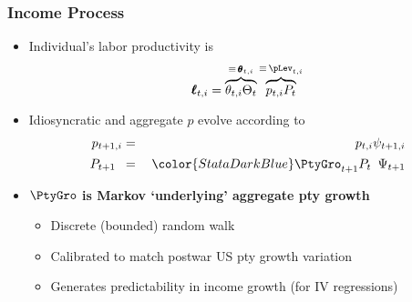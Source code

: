 \documentclass{beamer}\usepackage{dcolumn}
\newcommand{\jemph}[1]{{\color{StataDarkBlue}#1}}
\newcommand{\jbemph}[1]{\textbf{\color{SlideNavy}#1}}
\providecommand{\jemph}[1]{{\color{jirkasblue}#1}}
\begin{document}
\begin{frame}
\frametitle{Income Process}

\begin{itemize}
\item  Individual's labor productivity is
$$
\pmb{\ell}_{t,i} = \overbrace{\theta_{t,i}\Theta_{t}}^{\equiv\,\pmb{\theta}_{t,i}}\overbrace{{p}_{t,i} {P}_{t}}^{\equiv\, \pLev_{t,i}}
$$

\item  Idiosyncratic and aggregate $p$ evolve according to
\begin{eqnarray*}
{{p}}_{t+1,i} & =&  \phantom{\jemph{\PtyGro}_{t+1}}{{p}}_{t,i} \psi_{t+1,i}  \\
 {P}_{t+1\phantom{,i}} & =&  \jemph{\PtyGro}_{t+1} {P}_{t\phantom{,i}}\Psi_{t+1}
\end{eqnarray*}


  \item \jbemph{$\PtyGro$ is Markov `underlying' aggregate pty growth}
    \begin{itemize}
    \setlength{\itemsep}{1mm}
    \item Discrete (bounded) random walk
    \item Calibrated to match postwar US pty growth variation
    \item Generates predictability in income growth (for IV regressions)
    \end{itemize}
  \end{itemize}
\end{frame}
\end{document}
